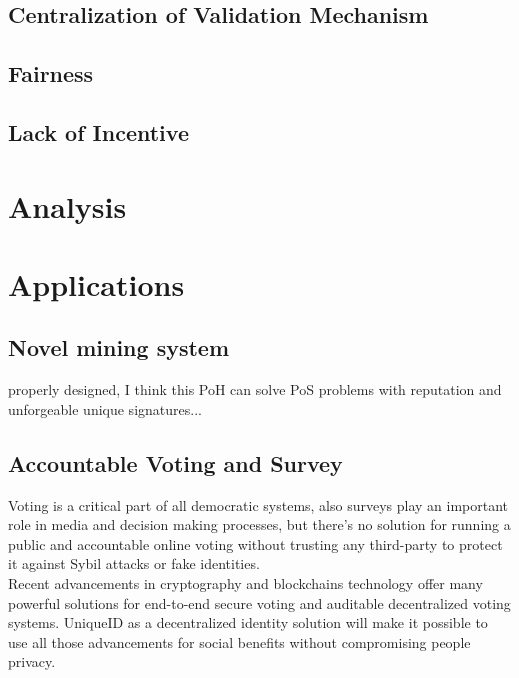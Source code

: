 \documentclass{article}
\begin{document}
\subsection{Centralization of Validation Mechanism}
\subsection{Fairness}
\subsection{Lack of Incentive}


\section{Analysis}

 
\section{Applications}

\subsection{Novel mining system}
properly designed, I think this PoH can solve PoS problems with reputation and unforgeable unique signatures...

\subsection{Accountable Voting and Survey}
Voting is a critical part of all democratic systems, also surveys play an important role in media and decision making processes, but there's no solution for running a public and accountable online voting without trusting any third-party to protect it against Sybil attacks or fake identities.\\
Recent advancements in cryptography and blockchains technology offer many powerful solutions for end-to-end secure voting and auditable decentralized voting systems. UniqueID as a decentralized identity solution will make it possible to use all those advancements for social benefits without compromising people privacy.
\end{document}
